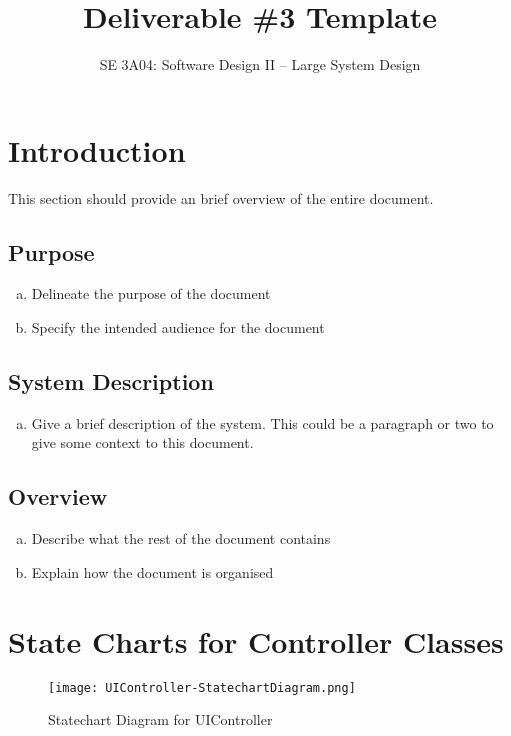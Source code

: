 \documentclass[]{article}
\title{Deliverable \#3 Template}
\author{SE 3A04: Software Design II -- Large System Design}
\date{}
\begin{document}
\maketitle	

\section{Introduction}
\label{sec:introduction}

This section should provide an brief overview of the entire document.

\subsection{Purpose}
\label{sub:purpose}
\begin{enumerate}[a)]
	\item Delineate the purpose of the document
	\item Specify the intended audience for the document
\end{enumerate}

\subsection{System Description}
\label{sub:system_description}
\begin{enumerate}[a)]
	\item Give a brief description of the system. This could be a paragraph or two to give some context to this document.
\end{enumerate}

\subsection{Overview}
\label{sub:overview}
\begin{enumerate}[a)]
	\item Describe what the rest of the document contains 
	\item Explain how the document is organised
\end{enumerate}



\section{State Charts for Controller Classes}
\label{sec:state_charts_for_controller_classes}
\begin{figure}
	\centering
	\texttt{[image: UIController-StatechartDiagram.png]}
	\caption{Statechart Diagram for UIController}
	\label{fig:uicontroller_statechart}
\end{figure}
\FloatBarrier
\end{document}
